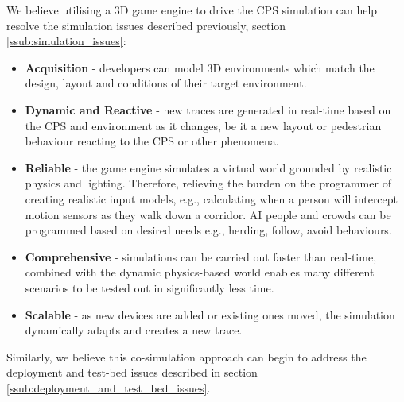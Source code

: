  We believe utilising a 3D game engine to drive the CPS simulation can help resolve the simulation issues described previously, section \ref{ssub:simulation_issues}:
 \begin{itemize}
  \item \textbf{Acquisition} - developers can model 3D environments which match the design, layout and conditions of their target environment.
  \item \textbf{Dynamic and Reactive} - new traces are generated in real-time based on the CPS and environment as it changes, be it a new layout or pedestrian behaviour reacting to the CPS or other phenomena.
  \item \textbf{Reliable} - the game engine simulates a virtual world grounded by realistic physics and lighting. Therefore, relieving the burden on the programmer of creating realistic input models, e.g., calculating when a person will intercept motion sensors as they walk down a corridor. AI people and crowds can be programmed based on desired needs e.g., herding, follow, avoid behaviours.
  \item \textbf{Comprehensive} - simulations can be carried out faster than real-time, combined with the dynamic physics-based world enables many different scenarios to be tested out in significantly less time.
  \item \textbf{Scalable} - as new devices are added or existing ones moved, the simulation dynamically adapts and creates a new trace.
\end{itemize}

Similarly, we believe this co-simulation approach can begin to address the deployment and test-bed issues described in section \ref{ssub:deployment_and_test_bed_issues}.

